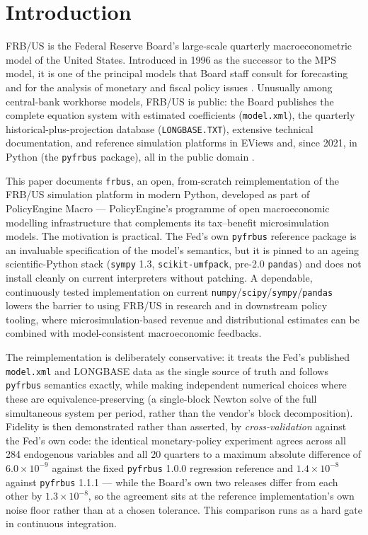 \section{Introduction}
\label{sec:intro}

FRB/US is the Federal Reserve Board's large-scale quarterly macroeconometric model of the United States. Introduced in 1996 as the successor to the MPS model, it is one of the principal models that Board staff consult for forecasting and for the analysis of monetary and fiscal policy issues \citep{brayton1996guide, brayton2014note}. Unusually among central-bank workhorse models, FRB/US is public: the Board publishes the complete equation system with estimated coefficients (\texttt{model.xml}), the quarterly historical-plus-projection database (\texttt{LONGBASE.TXT}), extensive technical documentation, and reference simulation platforms in EViews and, since 2021, in Python (the \texttt{pyfrbus} package), all in the public domain \citep{fedfrbusabout, fedfrbuspython}.

This paper documents \texttt{frbus}, an open, from-scratch reimplementation of the FRB/US simulation platform in modern Python, developed as part of PolicyEngine Macro --- PolicyEngine's programme of open macroeconomic modelling infrastructure that complements its tax--benefit microsimulation models. The motivation is practical. The Fed's own \texttt{pyfrbus} reference package is an invaluable specification of the model's semantics, but it is pinned to an ageing scientific-Python stack (\texttt{sympy} 1.3, \texttt{scikit-umfpack}, pre-2.0 \texttt{pandas}) and does not install cleanly on current interpreters without patching. A dependable, continuously tested implementation on current \texttt{numpy}/\texttt{scipy}/\texttt{sympy}/\texttt{pandas} lowers the barrier to using FRB/US in research and in downstream policy tooling, where microsimulation-based revenue and distributional estimates can be combined with model-consistent macroeconomic feedbacks.

The reimplementation is deliberately conservative: it treats the Fed's published \texttt{model.xml} and LONGBASE data as the single source of truth and follows \texttt{pyfrbus} semantics exactly, while making independent numerical choices where these are equivalence-preserving (a single-block Newton solve of the full simultaneous system per period, rather than the vendor's block decomposition). Fidelity is then demonstrated rather than asserted, by \emph{cross-validation} against the Fed's own code: the identical monetary-policy experiment agrees across all 284 endogenous variables and all 20 quarters to a maximum absolute difference of $6.0\times10^{-9}$ against the fixed \texttt{pyfrbus} 1.0.0 regression reference and $1.4\times10^{-8}$ against \texttt{pyfrbus} 1.1.1 --- while the Board's own two releases differ from each other by $1.3\times10^{-8}$, so the agreement sits at the reference implementation's own noise floor rather than at a chosen tolerance. This comparison runs as a hard gate in continuous integration.

